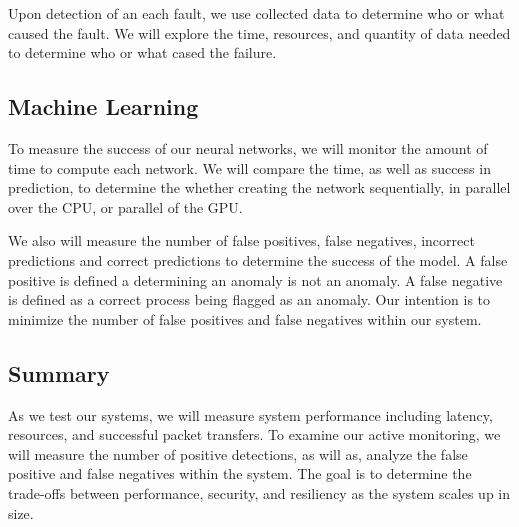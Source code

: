 \documentclass[../main.tex]{subfiles}
\begin{document}
Upon detection of an each fault, we use collected data to determine who or what caused the fault. We will explore the time, resources, and quantity of data needed to determine who or what cased the failure.


\subsection{Machine Learning}
To measure the success of our neural networks, we will monitor the amount of time to compute each network. We will compare the time, as well as success in prediction, to determine the whether creating the network sequentially, in parallel over the CPU, or parallel of the GPU.  

We also will measure the number of false positives, false negatives, incorrect predictions and correct predictions to determine the success of the model. A false positive is defined a determining an anomaly is not an anomaly. A false negative is defined as a correct process being flagged as an anomaly. Our intention is to minimize the number of false positives and false negatives within our system.


\subsection{Summary}
As we test our systems, we will measure system performance including latency, resources, and successful packet transfers. To examine our active monitoring, we will measure the number of positive detections, as will as, analyze the false positive and false negatives within the system. The goal is to determine the trade-offs between performance, security, and resiliency as the system scales up in size.
\end{document}
